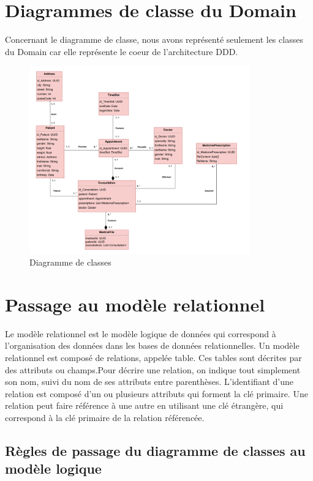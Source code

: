 \documentclass[a4paper]{report}
\begin{document}
\section{Diagrammes de classe du Domain}
Concernant le diagramme de classe, nous avons représenté seulement les classes du Domain car elle représente le coeur de l'architecture DDD.
\begin{figure}[H]
    \vspace{-10pt}
    \centering
    \includegraphics[width=0.85\textwidth]{besoins/class_diagram.png}
    \caption{Diagramme de classes}
    \label{fig:DCU9}
\end{figure}

\section{Passage au modèle relationnel}
Le modèle relationnel est le modèle logique de données qui correspond à l'organisation des données dans les bases de données relationnelles.
Un modèle relationnel est composé de relations, appelée table. Ces tables sont décrites par des attributs ou champs.Pour décrire une relation, on indique tout simplement son
nom, suivi du nom de ses attributs entre parenthèses. L'identifiant d'une relation
est composé d'un ou plusieurs attributs qui forment la clé primaire. Une relation
peut faire référence à une autre en utilisant une clé étrangère, qui correspond à
la clé primaire de la relation référencée. 


\subsection{Règles de passage du diagramme de classes au modèle logique}
\end{document}
